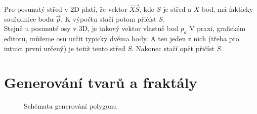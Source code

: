 \documentclass[a4paper,12pt]{book}
\begin{document}
Pro posunutý střed v 2D platí, že vektor $\vec{XS}$, kde $S$ je střed a $X$ bod, má fakticky souřadnice bodu $\vec{p}$. K výpočtu stačí potom přičíst $S$.\\

Stejně u posunuté osy v 3D, je takový vektor vlastně bod $p_a$
V praxi, grafickém editoru, můžeme osu určit typicky dvěma body. A ten jeden z nich (třeba pro intuici první určený) je totiž tento střed $S$. Nakonec stačí opět přičíst $S$.


\chapter{Generování tvarů a fraktály}


\begin{figure}[H]
  \centering
  \hfill
    \hfill
  \caption{Schémata generování polygonu}
  \centering
\end{figure}
 



 
\end{document}
